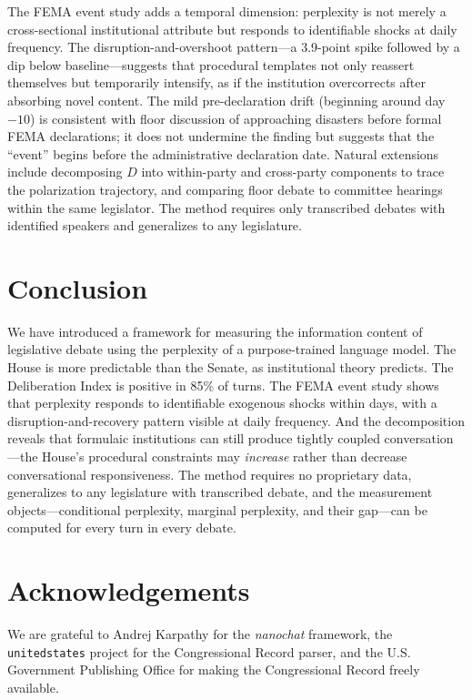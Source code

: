 \documentclass[12pt]{article}
\newcommand{\DI}{\mathit{D}}
\begin{document}
The FEMA event study adds a temporal dimension: perplexity is not merely a cross-sectional institutional attribute but responds to identifiable shocks at daily frequency. The disruption-and-overshoot pattern---a 3.9-point spike followed by a dip below baseline---suggests that procedural templates not only reassert themselves but temporarily intensify, as if the institution overcorrects after absorbing novel content. The mild pre-declaration drift (beginning around day $-10$) is consistent with floor discussion of approaching disasters before formal FEMA declarations; it does not undermine the finding but suggests that the ``event'' begins before the administrative declaration date. Natural extensions include decomposing $\DI$ into within-party and cross-party components to trace the polarization trajectory, and comparing floor debate to committee hearings within the same legislator. The method requires only transcribed debates with identified speakers and generalizes to any legislature.


\section{Conclusion}

We have introduced a framework for measuring the information content of legislative debate using the perplexity of a purpose-trained language model. The House is more predictable than the Senate, as institutional theory predicts. The Deliberation Index is positive in 85\% of turns. The FEMA event study shows that perplexity responds to identifiable exogenous shocks within days, with a disruption-and-recovery pattern visible at daily frequency. And the decomposition reveals that formulaic institutions can still produce tightly coupled conversation---the House's procedural constraints may \textit{increase} rather than decrease conversational responsiveness. The method requires no proprietary data, generalizes to any legislature with transcribed debate, and the measurement objects---conditional perplexity, marginal perplexity, and their gap---can be computed for every turn in every debate.


\section*{Acknowledgements}

We are grateful to Andrej Karpathy for the \textit{nanochat} framework, the \texttt{unitedstates} project for the Congressional Record parser, and the U.S. Government Publishing Office for making the Congressional Record freely available.
\end{document}
